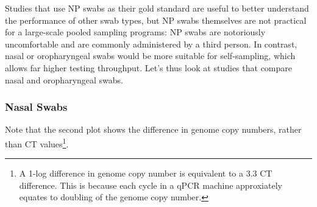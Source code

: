 \documentclass[
  letterpaper,
  DIV=11,
  numbers=noendperiod]{scrartcl}
\begin{document}
Studies that use NP swabs as their gold standard are useful to better
understand the performance of other swab types, but NP swabs themselves
are not practical for a large-scale pooled sampling programs: NP swabs
are notoriously uncomfortable and are commonly administered by a third
person. In contrast, nasal or oropharyngeal swabs would be more suitable
for self-sampling, which allows far higher testing throughput. Let's
thus look at studies that compare nasal and oropharyngeal swabs.

\subsubsection{Nasal Swabs}\label{nasal-swabs}

Note that the second plot shows the difference in genome copy numbers,
rather than CT values\footnote{A 1-log difference in genome copy number
  is equivalent to a 3.3 CT difference. This is because each cycle in a
  qPCR machine approxiately equates to doubling of the genome copy
  number.}.
\end{document}
